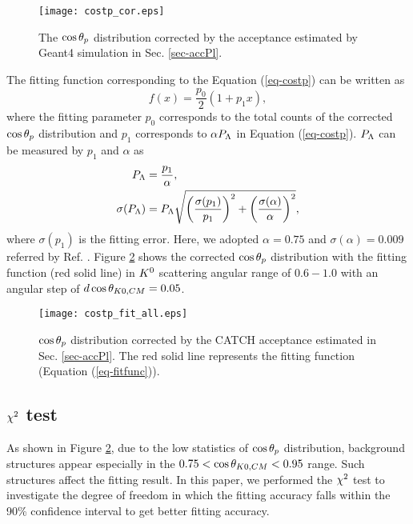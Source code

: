 \begin{figure}[h]
  \centering
  \texttt{[image: costp\_cor.eps]}
  \caption{The $\cos{\theta_p}$ distribution corrected by the acceptance estimated by Geant4 simulation in Sec. \ref{sec-accPl}.}
  \label{fig-costp_cor}
\end{figure}

The fitting function corresponding to the Equation (\ref{eq-costp}) can be written as
\begin{equation}
  f(x) = \frac{p_0}{2} (1+p_1x),
  \label{eq-fitfunc}
\end{equation}
where the fitting parameter $p_0$ corresponds to the total counts of the corrected $\cos{\theta_p}$ distribution and $p_1$ corresponds to $\alpha P_{\Lambda}$ in Equation (\ref{eq-costp}). $P_{\Lambda}$ can be measured by $p_1$ and $\alpha$ as
\begin{align}
  P_{\Lambda} &= \frac{p_1}{\alpha}, \label{eq-PL} \\
  \sigma(P_{\Lambda}) &= P_{\Lambda} \sqrt{ \left( \frac{\sigma(p_1)}{p_1} \right)^2 + \left( \frac{\sigma(\alpha)}{\alpha} \right)^2},
\end{align}
where $\sigma(p_1)$ is the fitting error. %
Here, we adopted $\alpha=0.75$ and $\sigma(\alpha)=0.009$ referred by Ref. \cite{Alpha}. Figure \ref{fig-costp_fit_all} shows the corrected $\cos{\theta_p}$ distribution with the fitting function (red solid line) in $K^{0}$ scattering angular range of $0.6 - 1.0$ with an angular step of $d\cos{\theta_{K0,CM}}=0.05$. 

\begin{figure}[h]
  \centering
  \texttt{[image: costp\_fit\_all.eps]}
  \caption{$\cos{\theta_p}$ distribution corrected by the CATCH acceptance estimated in Sec. \ref{sec-accPl}. The red solid line represents the fitting function (Equation (\ref{eq-fitfunc})).}
  \label{fig-costp_fit_all}
\end{figure}


\subsection{$\chi^{2}$ test}

As shown in Figure \ref{fig-costp_fit_all}, due to the low statistics of $\cos{\theta_p}$ distribution, background structures appear especially in the $0.75<\cos{\theta_{K0,CM}}<0.95$ range. Such structures affect the fitting result. In this paper, we performed the $\chi^{2}$ test to investigate the degree of freedom in which the fitting accuracy falls within the 90\% confidence interval to get better fitting accuracy. 

